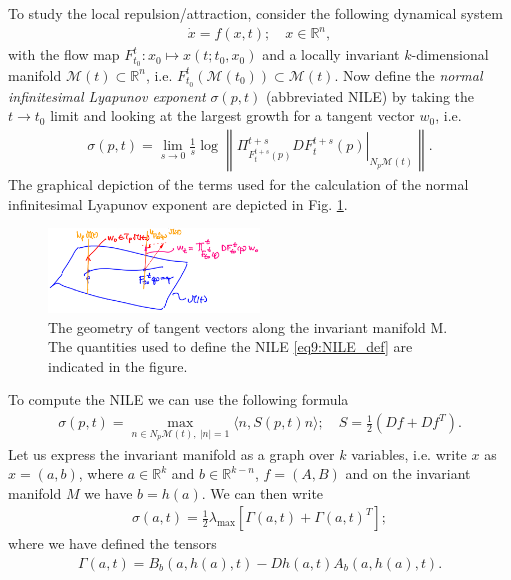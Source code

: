To study the local repulsion/attraction, consider the following dynamical system
\begin{align}
	\dot{x}= f(x,t);\quad x \in \mathbb{R}^{n},
\end{align}
with the flow map $F_{t_0}^{t}: x_0 \mapsto x(t;t_0, x_0)$ and a locally invariant $k$-dimensional manifold $\mathcal{M}(t) \subset \mathbb{R}^{n}$, i.e. $F_{t_0}^{t}(\mathcal{M}(t_0)) \subset \mathcal{M}(t)$. Now define the \emph{normal infinitesimal Lyapunov exponent} $\sigma(p,t)$ (abbreviated NILE) by taking the $t\to t_0$ limit and looking at the largest growth for a tangent vector $w_0$, i.e.
\begin{align}
	\boxed{
		\sigma(p,t) = \lim_{s\to 0} \frac{1}{s} \log \left\| \left.\Pi_{F_{t}^{t+s}(p)}^{t+s}DF_{t}^{t+s}(p) \right|_{N_{p}\mathcal{M}(t)} \right\|. 
		} \label{eq9:NILE_def}
\end{align}
The graphical depiction of the terms used for the calculation of the normal infinitesimal Lyapunov exponent are depicted in Fig. \ref{fig:NILE_def}.
\begin{figure}[h!]
	\centering
	\includegraphics[width=0.5\textwidth]{figures/ch9/24NILE_def.png}
	\caption{The geometry of tangent vectors along the invariant manifold M. The quantities used to define the NILE \eqref{eq9:NILE_def} are indicated in the figure.}
	\label{fig:NILE_def}
\end{figure}

To compute the NILE we can use the following formula
\begin{align}
	\boxed{\sigma(p,t) = \max_{n\in N_{p}\mathcal{M}(t),\ |n|=1} \langle n, S(p,t)n\rangle;\quad S = \frac{1}{2}\left( Df + Df^{T}\right). }
\end{align}
Let us express the invariant manifold as a graph over $k$ variables, i.e. write $x$ as $x = (a,b)$, where $a \in \mathbb{R}^k$ and $b\in \mathbb{R}^{k-n}$, $f = (A, B)$ and on the invariant manifold $M$ we have $b = h(a)$. We can then write
\begin{align}
	\sigma(a,t) = \frac{1}{2}\lambda _{ \textrm{max} }\left[ \Gamma(a,t) + \Gamma(a,t)^{T} \right];
\end{align}
where we have defined the tensors
\begin{align}
	\Gamma(a,t)= B_{b} (a, h(a),t) - Dh(a,t) A_{b}(a, h(a),t).
\end{align}

